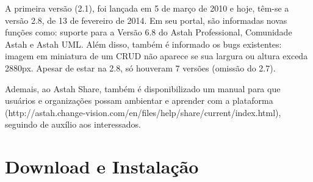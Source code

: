 \documentclass[12pt,a4paper]{article}
\begin{document}
A primeira versão (2.1), foi lançada em 5 de março de 2010 e hoje, têm-se a versão 2.8, de 13 de fevereiro de 2014. Em seu portal, são informadas novas funções como: suporte para a Versão 6.8 do Astah Professional, Comunidade Astah e Astah UML. Além disso, também é informado os bugs existentes: imagem em miniatura de um CRUD não aparece se sua largura ou altura exceda 2880px. Apesar de estar na 2.8, só houveram 7 versões (omissão do 2.7).

Ademais, ao Astah Share, também é disponibilizado um manual para que usuários e organizações possam ambientar e aprender com a plataforma (http://astah.change-vision.com/en/files/help/share/current/index.html), seguindo de auxílio aos interessados.

\section{Download e Instalação}%
\end{document}
